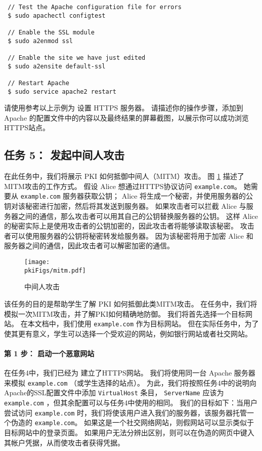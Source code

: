 \begin{lstlisting}
 // Test the Apache configuration file for errors
 $ sudo apachectl configtest

 // Enable the SSL module
 $ sudo a2enmod ssl

 // Enable the site we have just edited
 $ sudo a2ensite default-ssl

 // Restart Apache
 $ sudo service apache2 restart
\end{lstlisting}



请使用参考以上示例为 \pkiserver 设置 HTTPS 服务器。
请描述你的操作步骤，添加到 Apache 的配置文件中的内容以及最终结果的屏幕截图，以展示你可以成功浏览HTTPS站点。



\subsection{任务 5： 发起中间人攻击}

在此任务中，我们将展示 PKI 如何抵御中间人（MITM）攻击。
图 \ref{pki:fig:mitm} 描述了MITM攻击的工作方式。
假设 Alice 想通过HTTPS协议访问 \texttt{example.com}。
她需要从 \texttt{example.com} 服务器获取公钥； Alice 将生成一个秘密，并使用服务器的公钥对该秘密进行加密，然后将其发送到服务器。
如果攻击者可以拦截 Alice 与服务器之间的通信，那么攻击者可以用其自己的公钥替换服务器的公钥。
这样 Alice 的秘密实际上是使用攻击者的公钥加密的，因此攻击者将能够读取该秘密。
攻击者可以使用服务器的公钥将秘密转发给服务器。
因为该秘密将用于加密 Alice 和服务器之间的通信，因此攻击者可以解密加密的通信。


\begin{figure}[htb]
   \begin{center}
      \texttt{[image: \\pkiFigs/mitm.pdf]}
   \end{center}
   \caption{中间人攻击}
   \label{pki:fig:mitm}
\end{figure}



该任务的目的是帮助学生了解 PKI 如何抵御此类MITM攻击。
在任务中，我们将模拟一次MITM攻击，并了解PKI如何精确地防御。
我们将首先选择一个目标网站。
在本文档中，我们使用 \texttt{example.com} 作为目标网站。
但在实际任务中，为了使其更有意义，学生可以选择一个受欢迎的网站，例如银行网站或者社交网站。


\paragraph{第 1 步： 启动一个恶意网站}
在任务4中，我们已经为 \pkiserver 建立了HTTPS网站。
我们将使用同一台 Apache 服务器来模拟 \texttt{example.com} （或学生选择的站点）。
为此，我们将按照任务4中的说明向Apache的SSL配置文件中添加 \texttt{VirtualHost} 条目， \texttt{ServerName} 应该为 \texttt{example.com} ，但其余配置可以与任务4中使用的相同。
我们的目标如下：当用户尝试访问 \texttt{example.com} 时，我们将使该用户进入我们的服务器，该服务器托管一个伪造的 \texttt{example.com}。
如果这是一个社交网络网站，则假网站可以显示类似于目标网站中的登录页面。
如果用户无法分辨出区别，则可以在伪造的网页中键入其帐户凭据，从而使攻击者获得凭据。


